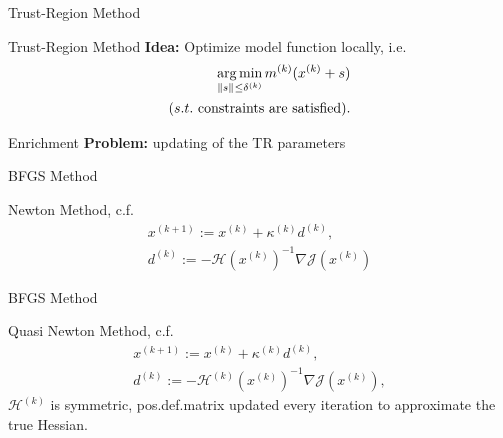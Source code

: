 \begin{frame}{Trust-Region Method}
    \begin{block}{Trust-Region Method}
        \textbf{Idea:} Optimize model function locally, i.e.\@
        \begin{align*}
            \operatorname*{arg\,min}\limits_{\left\lVert s\right\rVert_{} \leq \delta^{(k)}} m^{(k)}(x^{(k)} + s) \\
            (s.t. \text{ constraints are satisfied}).
        \end{align*}
    \end{block}
\end{frame}

\begin{frame}{Enrichment}
    \textbf{Problem:} updating of the TR parameters
\end{frame}

\begin{frame}{BFGS Method}
    \begin{block}{Newton Method, c.f.~\cite{Nocedal2006}}
        \vspace*{-13pt}
        \begin{align*}
            x^{(k + 1)} := x^{(k)} + \kappa^{(k)} d^{(k)}, \\
            d^{(k)} := - {\mathcal{H}(x^{(k)})}^{-1} \nabla \mathcal{J}(x^{(k)})
        \end{align*}
    \end{block}
\end{frame}

\begin{frame}{BFGS Method}
    \begin{block}{Quasi Newton Method, c.f.~\cite{Kelley1999, Nocedal2006}}
        \vspace*{-13pt}
        \begin{align*}
            x^{(k + 1)} := x^{(k)} + \kappa^{(k)} d^{(k)}, \\
            d^{(k)} := - {\mathcal{H}^{(k)}(x^{(k)})}^{-1} \nabla \mathcal{J}(x^{(k)}),
        \end{align*}
        $\mathcal{H}^{(k)}$ is symmetric, pos.\@ def.\@ matrix updated every iteration to approximate the true Hessian.
    \end{block}
\end{frame}

